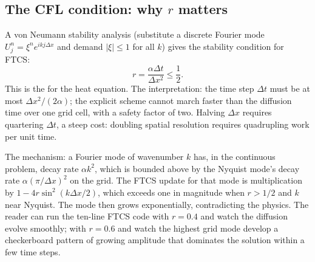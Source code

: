 \subsection{The CFL condition: why $r$ matters}

A von Neumann stability analysis (substitute a discrete Fourier
mode $U_{j}^{n} = \xi^{n} e^{i k j \Delta x}$ and demand $|\xi|
\leq 1$ for all $k$) gives the stability condition for FTCS:
\[
r = \frac{\alpha \Delta t}{\Delta x^{2}} \leq \frac{1}{2}.
\]
This is the  for the
heat equation. The interpretation: the time step $\Delta t$ must
be at most $\Delta x^{2}/(2 \alpha)$; the explicit scheme cannot
march faster than the diffusion time over one grid cell, with a
safety factor of two. Halving $\Delta x$ requires quartering
$\Delta t$, a steep cost: doubling spatial resolution requires
quadrupling work per unit time.

The mechanism: a Fourier mode of wavenumber $k$ has, in the
continuous problem, decay rate $\alpha k^{2}$, which is bounded
above by the Nyquist mode's decay rate $\alpha (\pi/\Delta x)^{2}$
on the grid. The FTCS update for that mode is multiplication by
$1 - 4 r \sin^{2}(k \Delta x/2)$, which exceeds one in magnitude
when $r > 1/2$ and $k$ near Nyquist. The mode then grows
exponentially, contradicting the physics. The reader can run the
ten-line FTCS code with $r = 0.4$ and watch the diffusion
evolve smoothly; with $r = 0.6$ and watch the highest grid mode
develop a checkerboard pattern of growing amplitude that
dominates the solution within a few time steps.

